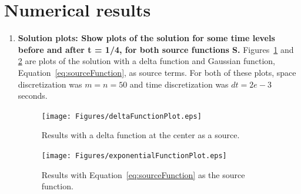 

\section{Numerical results} 

\label{sec:numerical_results}
\begin{enumerate}
	\item \textbf{Solution plots: Show plots of the solution for some time levels before and after t = 1/4, for \textbf{both} source functions S.} 
	{\color{blue} Figures~\ref{fig:Figures_deltaFunctionPlot} and \ref{fig:Figures_exponentialFunctionPlot} are plots of the solution with a delta function and Gaussian function, Equation~\eqref{eq:sourceFunction}, as source terms. For both of these plots, space discretization was $m=n=50$ and time discretization was $dt=2e-3$ seconds.} 
	\begin{figure}
		[htbp] \centering 
		\texttt{[image: Figures/deltaFunctionPlot.eps]} \caption{Results with a delta function at the center as a source.} \label{fig:Figures_deltaFunctionPlot} 
	\end{figure}
	 
	\begin{figure}
		[htbp] \centering 
		\texttt{[image: Figures/exponentialFunctionPlot.eps]} \caption{Results with Equation~\eqref{eq:sourceFunction} as the source function.} \label{fig:Figures_exponentialFunctionPlot} 
	\end{figure}%
	

\end{enumerate}
